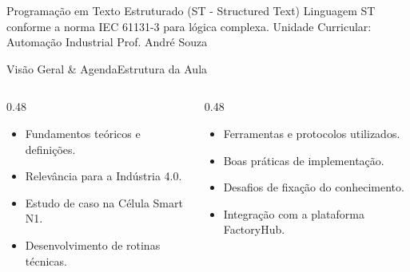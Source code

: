 
\senaicover
  {Programação em Texto Estruturado (ST - Structured Text)}
  {Linguagem ST conforme a norma IEC 61131-3 para lógica complexa.}
  {Unidade Curricular: Automação Industrial}
  {Prof. André Souza}

\begin{senaiframe}{Visão Geral \& Agenda}{Estrutura da Aula}
  \begin{columns}[t]
    \begin{column}{0.48\textwidth}
      \begin{tcolorbox}[senaibluecard, title={1. Conceitos Chave}]
        \begin{itemize}
          \item Fundamentos teóricos e definições.
          \item Relevância para a Indústria 4.0.
        \end{itemize}
      \end{tcolorbox}
      \vspace{4pt}
      \begin{tcolorbox}[senaiambercard, title={3. Aplicação Prática}]
        \begin{itemize}
          \item Estudo de caso na Célula Smart N1.
          \item Desenvolvimento de rotinas técnicas.
        \end{itemize}
      \end{tcolorbox}
    \end{column}
    \begin{column}{0.48\textwidth}
      \begin{tcolorbox}[senairedcard, title={2. Detalhamento Técnico}]
        \begin{itemize}
          \item Ferramentas e protocolos utilizados.
          \item Boas práticas de implementação.
        \end{itemize}
      \end{tcolorbox}
      \vspace{4pt}
      \begin{tcolorbox}[senaigreencard, title={4. Exercícios \& Avaliação}]
        \begin{itemize}
          \item Desafios de fixação do conhecimento.
          \item Integração com a plataforma FactoryHub.
        \end{itemize}
      \end{tcolorbox}
    \end{column}
  \end{columns}
\end{senaiframe}

